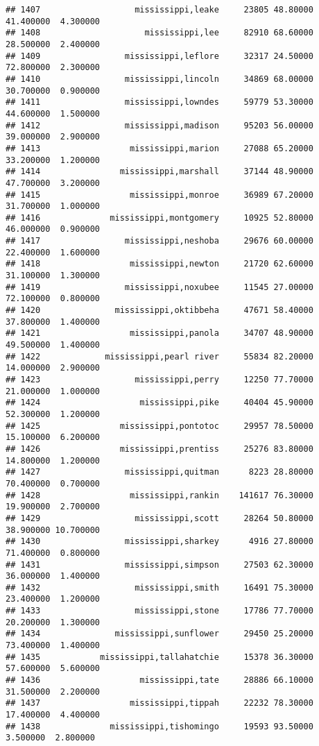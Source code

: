 \documentclass[
]{article}
\begin{document}
\begin{verbatim}
## 1407                   mississippi,leake     23805 48.80000 41.400000  4.300000
## 1408                     mississippi,lee     82910 68.60000 28.500000  2.400000
## 1409                 mississippi,leflore     32317 24.50000 72.800000  2.300000
## 1410                 mississippi,lincoln     34869 68.00000 30.700000  0.900000
## 1411                 mississippi,lowndes     59779 53.30000 44.600000  1.500000
## 1412                 mississippi,madison     95203 56.00000 39.000000  2.900000
## 1413                  mississippi,marion     27088 65.20000 33.200000  1.200000
## 1414                mississippi,marshall     37144 48.90000 47.700000  3.200000
## 1415                  mississippi,monroe     36989 67.20000 31.700000  1.000000
## 1416              mississippi,montgomery     10925 52.80000 46.000000  0.900000
## 1417                 mississippi,neshoba     29676 60.00000 22.400000  1.600000
## 1418                  mississippi,newton     21720 62.60000 31.100000  1.300000
## 1419                 mississippi,noxubee     11545 27.00000 72.100000  0.800000
## 1420               mississippi,oktibbeha     47671 58.40000 37.800000  1.400000
## 1421                  mississippi,panola     34707 48.90000 49.500000  1.400000
## 1422             mississippi,pearl river     55834 82.20000 14.000000  2.900000
## 1423                   mississippi,perry     12250 77.70000 21.000000  1.000000
## 1424                    mississippi,pike     40404 45.90000 52.300000  1.200000
## 1425                mississippi,pontotoc     29957 78.50000 15.100000  6.200000
## 1426                mississippi,prentiss     25276 83.80000 14.800000  1.200000
## 1427                 mississippi,quitman      8223 28.80000 70.400000  0.700000
## 1428                  mississippi,rankin    141617 76.30000 19.900000  2.700000
## 1429                   mississippi,scott     28264 50.80000 38.900000 10.700000
## 1430                 mississippi,sharkey      4916 27.80000 71.400000  0.800000
## 1431                 mississippi,simpson     27503 62.30000 36.000000  1.400000
## 1432                   mississippi,smith     16491 75.30000 23.400000  1.200000
## 1433                   mississippi,stone     17786 77.70000 20.200000  1.300000
## 1434               mississippi,sunflower     29450 25.20000 73.400000  1.400000
## 1435            mississippi,tallahatchie     15378 36.30000 57.600000  5.600000
## 1436                    mississippi,tate     28886 66.10000 31.500000  2.200000
## 1437                  mississippi,tippah     22232 78.30000 17.400000  4.400000
## 1438              mississippi,tishomingo     19593 93.50000  3.500000  2.800000

\end{verbatim}
\end{document}
